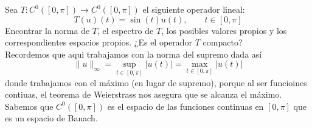 \begin{ejercicio}
    Sea $T: C^0([0,\pi]) \longrightarrow C^0([0,\pi])$ el siguiente operador lineal:
    \[ T(u)(t) = \sin(t) u(t), \qquad t \in [0,\pi] \]
    Encontrar la norma de $T$, el espectro de $T$, los posibles valores propios y los correspondientes espacios propios. ¿Es el operador $T$ compacto? \\
    \noindent
    Recordemos que aqui trabajamos con la norma del supremo dada así
    $$\|u\|_\infty =\sup_{t \in [0,\pi]} |u(t)|=\max_{t \in [0,\pi]} |u(t)|$$
    donde trabajamos con el máximo (en lugar de supremo), porque al ser funcioines contiuas, el teorema de Weierstrass nos asegura que se alcanza el máximo. Sabemos que $C^0([0,\pi])$ es el espacio de las funciones continuas en $[0,\pi]$ que es un espacio de Banach. \\


\end{ejercicio}
